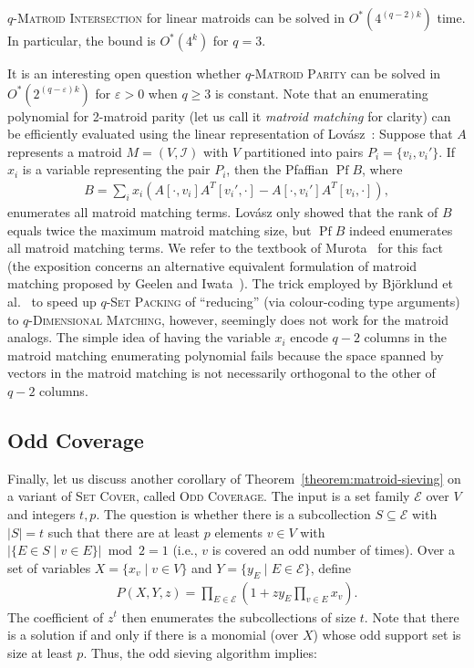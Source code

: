 \documentclass{theoretics}
\newcommand{\cI}{\ensuremath{\mathcal I}\xspace}
\newcommand{\cE}{\ensuremath{\mathcal E}\xspace}
\DeclareMathOperator{\Pf}{Pf}
\begin{document}
\begin{theorem} \label{thm:general-intersection}
  \textsc{$q$-Matroid Intersection} for linear matroids can be solved in $O^*(4^{(q - 2)k})$ time.
  In particular, the bound is $O^*(4^k)$ for $q = 3$.
\end{theorem}

It is an interesting open question whether \textsc{$q$-Matroid Parity} can be solved in $O^*(2^{(q - \varepsilon)k})$ for $\varepsilon > 0$ when $q \ge 3$ is constant.
Note that an enumerating polynomial for 2-matroid parity (let us call it \emph{matroid matching} for clarity) can be efficiently evaluated using the linear representation of Lov\'asz~\cite{Lovasz79}:
Suppose that $A$ represents a matroid $M = (V, \cI)$ with $V$ partitioned into pairs $P_i = \{ v_i, v_i' \}$.
If $x_i$ is a variable representing the pair $P_i$, then the Pfaffian $\Pf B$, where
\begin{align*}
   B = \sum_i x_i (A[\cdot, v_i] A^T[v_i', \cdot] - A[\cdot, v_i'] A^T[v_i, \cdot]),
\end{align*}
enumerates all matroid matching terms.
Lov\'asz \cite{Lovasz79} only showed that the rank of $B$ equals twice the maximum matroid matching size, but $\Pf B$ indeed enumerates all matroid matching terms.
We refer to the textbook of Murota~\cite[Section 7.3.4]{murota1999matrices} for this fact (the exposition concerns an alternative equivalent formulation of matroid matching proposed by Geelen and Iwata~\cite{GeelenI05}).
The trick employed by Bj\"{o}rklund et al.~\cite{BjorklundHKK17narrow} to speed up \textsc{$q$-Set Packing} of ``reducing'' (via colour-coding type arguments) to \textsc{$q$-Dimensional Matching}, however, seemingly does not work for the matroid analogs.
The simple idea of having the variable $x_i$ encode $q - 2$ columns in the matroid matching enumerating polynomial fails because the space spanned by vectors in the matroid matching is not necessarily orthogonal to the other of $q - 2$ columns.

\subsection{Odd Coverage}
Finally, let us discuss another corollary of Theorem~\ref{theorem:matroid-sieving} on a variant of \textsc{Set Cover}, called \textsc{Odd Coverage}.
The input is a set family $\cE$ over $V$ and integers $t, p$.
The question is whether there is a subcollection $S \subseteq \cE$ with $|S| = t$ such that there are at least $p$ elements $v \in V$ with $|\{ E \in S \mid v \in E \}| \bmod 2 = 1$ (i.e., $v$ is covered an odd number of times).
Over a set of variables $X = \{ x_v \mid v \in V \}$ and $Y = \{ y_E \mid E \in \cE \}$, define
\begin{align*}
  P(X, Y, z) = \prod_{E \in \cE} \left(1 + z y_E \prod_{v \in E} x_v \right).
\end{align*}
The coefficient of $z^t$ then enumerates the subcollections of size $t$.
Note that there is a solution if and only if there is a monomial (over $X$) whose odd support set is size at least $p$.
Thus, the odd sieving algorithm implies:
\end{document}
